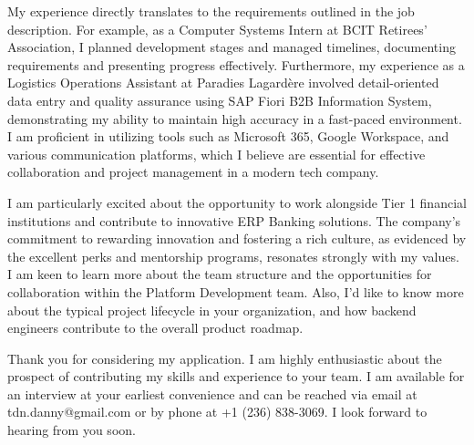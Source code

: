 \documentclass[letterpaper,11pt]{article}
\begin{document}
My experience directly translates to the requirements outlined in the job description. For example, as a Computer Systems Intern at BCIT Retirees’ Association, I planned development stages and managed timelines, documenting requirements and presenting progress effectively. Furthermore, my experience as a Logistics Operations Assistant at Paradies Lagardère involved detail-oriented data entry and quality assurance using SAP Fiori B2B Information System, demonstrating my ability to maintain high accuracy in a fast-paced environment. I am proficient in utilizing tools such as Microsoft 365, Google Workspace, and various communication platforms, which I believe are essential for effective collaboration and project management in a modern tech company.
\vspace{10pt}

I am particularly excited about the opportunity to work alongside Tier 1 financial institutions and contribute to innovative ERP Banking solutions. The company's commitment to rewarding innovation and fostering a rich culture, as evidenced by the excellent perks and mentorship programs, resonates strongly with my values. I am keen to learn more about the team structure and the opportunities for collaboration within the Platform Development team. Also, I'd like to know more about the typical project lifecycle in your organization, and how backend engineers contribute to the overall product roadmap.
\vspace{10pt}

Thank you for considering my application. I am highly enthusiastic about the prospect of contributing my skills and experience to your team. I am available for an interview at your earliest convenience and can be reached via email at tdn.danny@gmail.com or by phone at +1 (236) 838-3069. I look forward to hearing from you soon.
\vspace{20pt}
\end{document}
